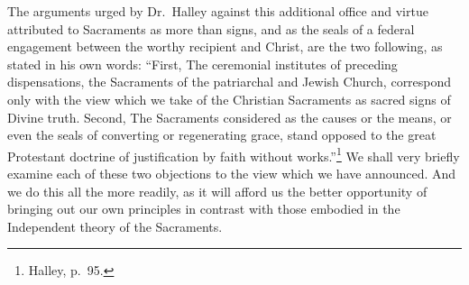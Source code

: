 \documentclass[
]{book}
\begin{document}
The arguments urged by Dr.~Halley against this additional office and virtue attributed to Sacraments as more than signs, and as the seals of a federal engagement between the worthy recipient and Christ, are the two following, as stated in his own words: ``First, The ceremonial institutes of preceding dispensations, the Sacraments of the patriarchal and Jewish Church, correspond only with the view which we take of the Christian Sacraments as sacred signs of Divine truth. Second, The Sacraments considered as the causes or the means, or even the seals of converting or regenerating grace, stand opposed to the great Protestant doctrine of justification by faith without works.''\footnote{Halley, p.~95.} We shall very briefly examine each of these two objections to the view which we have announced. And we do this all the more readily, as it will afford us the better opportunity of bringing out our own principles in contrast with those embodied in the Independent theory of the Sacraments.
\end{document}
